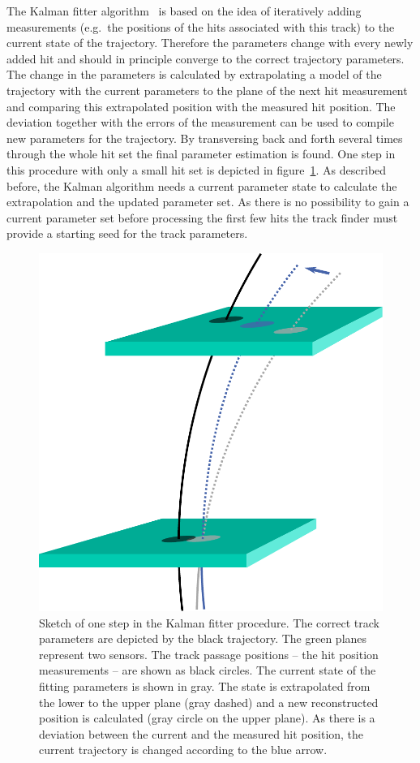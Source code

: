 The Kalman fitter algorithm~\cite{kalman} is based on the idea of iteratively adding measurements (e.g.\ the positions of the hits associated with this track) to the current state of the trajectory. Therefore the parameters change with every newly added hit and should in principle converge to the correct trajectory parameters. The change in the parameters is calculated by extrapolating a model of the trajectory with the current parameters to the plane of the next hit measurement and comparing this extrapolated position with the measured hit position. The deviation together with the errors of the measurement can be used to compile new parameters for the trajectory. By transversing back and forth several times through the whole hit set the final parameter estimation is found. One step in this procedure with only a small hit set is depicted in figure~\ref{fig-kalman}. As described before, the Kalman algorithm needs a current parameter state to calculate the extrapolation and the updated parameter set. As there is no possibility to gain a current parameter set before processing the first few hits the track finder must provide a starting seed for the track parameters.

\begin{figure}
 \centering
 \includegraphics[width=0.6\linewidth]{figures/theory/kalman.pdf}
 \caption[One step of the Kalman fitter procedure.]{Sketch of one step in the Kalman fitter procedure. The correct track parameters are depicted by the black trajectory. The green planes represent two sensors. The track passage positions -- the hit position measurements -- are shown as black circles. The current state of the fitting parameters is shown in gray. The state is extrapolated from the lower to the upper plane (gray dashed) and a new reconstructed position is calculated (gray circle on the upper plane). As there is a deviation between the current and the measured hit position, the current trajectory is changed according to the blue arrow.}
 \label{fig-kalman}
\end{figure}

